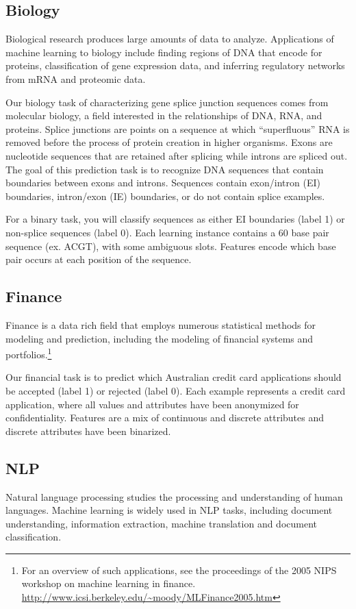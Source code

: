 \documentclass[11pt]{article}
\begin{document}
	\subsection{Biology}
	Biological research produces large amounts of data to analyze. Applications of machine learning to biology include finding regions of DNA that encode for proteins, classification of gene expression data, and inferring regulatory networks from mRNA and proteomic data.
	
	Our biology task of characterizing gene splice junction sequences comes from molecular biology, a field interested in the relationships of DNA, RNA, and proteins. Splice junctions are points on a sequence at which ``superfluous'' RNA is removed before the process of protein creation in higher organisms. Exons are nucleotide sequences that are retained after splicing while introns are spliced out. The goal of this prediction task is to recognize DNA sequences that contain boundaries between exons and introns. Sequences contain exon/intron (EI) boundaries, intron/exon (IE) boundaries, or do not contain splice examples.
	
	For a binary task, you will classify sequences as either EI boundaries (label 1) or non-splice sequences (label 0). Each learning instance contains a 60 base pair sequence (ex. ACGT), with some ambiguous slots. Features encode which base pair occurs at each position of the sequence.
	
	\subsection{Finance}
	Finance is a data rich field that employs numerous statistical methods for modeling and prediction, including the modeling of financial systems and portfolios.\footnote{For an overview of such applications, see the proceedings of the 2005 NIPS workshop on machine learning in finance. \href{http://www.icsi.berkeley.edu/~moody/MLFinance2005.htm}{\url{http://www.icsi.berkeley.edu/~moody/MLFinance2005.htm}}}
	
	Our financial task is to predict which Australian credit card applications should be accepted (label 1) or rejected (label 0). Each example represents a credit card application, where all values and attributes have been anonymized for confidentiality. Features are a mix of continuous and discrete attributes and discrete attributes have been binarized.
	
	\subsection{NLP}
	Natural language processing studies the processing and understanding of human languages. Machine learning is widely used in NLP tasks, including document understanding, information extraction, machine translation and document classification.
	
\end{document}
